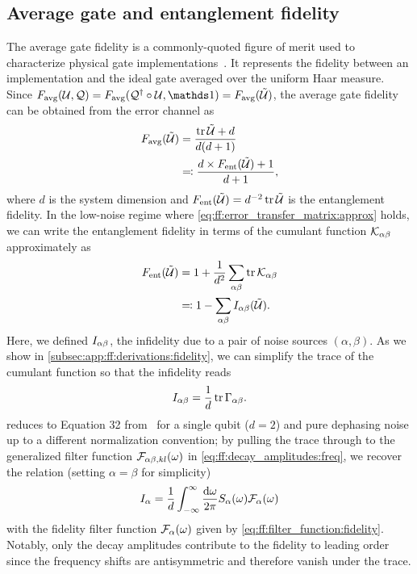 \subsection{Average gate and entanglement fidelity}\label{subsec:ff:theory:derived_quantities:entanglement_fidelity}
The average gate fidelity is a commonly-quoted figure of merit used to characterize physical gate implementations~\cite{Loss1998,Ladd2010,Chow2012,Veldhorst2014,Yoneda2018}.
It represents the fidelity between an implementation \liouvU and the ideal gate \liouvQ averaged over the uniform Haar measure.
Since $\avgfid(\liouvU, \liouvQ) = \avgfid(\liouvQ\adjoint\circ\liouvU, \eye) = \avgfid(\liouvUe)$, the average gate fidelity can be obtained from the error channel \liouvUe as~\cite{Horodecki1999,Nielsen2002}
\begin{align}
    F_{\mathrm{avg}}(\mathcal{\tilde{U}}) &= \frac{\tr\mathcal{\tilde{U}} + d}{d(d+1)} \label{eq:ff:fidelity:avg}\\
                      &\eqqcolon \frac{d\times F_{\mathrm{ent}}(\mathcal{\tilde{U}}) + 1}{d + 1}, \label{eq:ff:fidelity:avg-ent}
\end{align}
where $d$ is the system dimension and $F_{\mathrm{ent}}(\mathcal{\tilde{U}}) = d^{-2}\tr\mathcal{\tilde{U}}$ is the entanglement fidelity.
In the low-noise regime where \cref{eq:ff:error_transfer_matrix:approx} holds, we can write the entanglement fidelity in terms of the cumulant function $\mathcal{K}_{\alpha\beta}$ approximately as
\begin{align}\label{eq:ff:fidelity:ent}
    F_{\mathrm{ent}}(\mathcal{\tilde{U}}) &= 1 + \frac{1}{d^2}\sum_{\alpha\beta}\tr\mathcal{K}_{\alpha\beta} \\
                      &\eqqcolon 1 - \sum_{\alpha\beta}I_{\alpha\beta}(\mathcal{\tilde{U}}).
\end{align}
Here, we defined $I_{\alpha\beta}$, the infidelity due to a pair of noise sources $(\alpha,\beta)$.
As we show in \cref{subsec:app:ff:derivations:fidelity}, we can simplify the trace of the cumulant function so that the infidelity reads
\begin{equation}\label{eq:ff:infidelity:ent}
    I_{\alpha\beta} = \frac{1}{d}\tr\Gamma_{\alpha\beta}.
\end{equation}
 reduces to Equation 32 from~ for a single qubit ($d=2$) and pure dephasing noise up to a different normalization convention; by pulling the trace through to the generalized filter function $\mathcal{F}_{\alpha\beta,kl}(\omega)$ in \cref{eq:ff:decay_amplitudes:freq}, we recover the relation (setting $\alpha=\beta$ for simplicity)
\begin{equation}\label{eq:ff:infidelity:ent:integral}
    I_{\alpha} = \frac{1}{d}\int_{-\infty}^\infty\frac{\dd{\omega}}{2\pi} S_{\alpha}(\omega) \mathcal{F}_{\alpha}(\omega)
\end{equation}
with the fidelity filter function $\mathcal{F}_{\alpha}(\omega)$ given by \cref{eq:ff:filter_function:fidelity}.
Notably, only the decay amplitudes \decayamps contribute to the fidelity to leading order since the frequency shifts \freqshifts are antisymmetric and therefore vanish under the trace.

